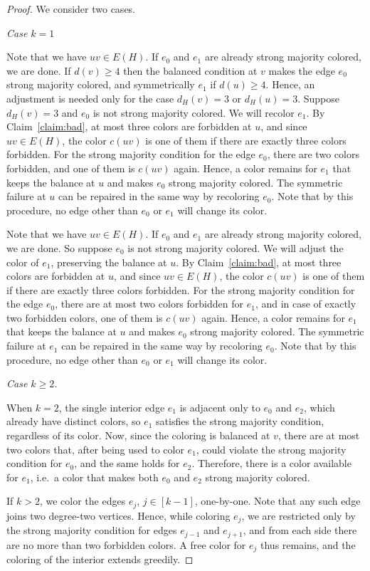 \documentclass[10pt,a4paper]{amsart}
\begin{document}
\begin{proof}
We consider two cases.

\smallskip
\emph{Case $k=1$}
\smallskip

Note that we have $uv\in E(H)$. If $e_0$ and $e_1$ are already strong majority colored, we are done. If $d(v)\ge 4$ then the balanced condition at $v$ makes the edge $e_0$ strong majority colored, and symmetrically $e_1$ if $d(u)\ge 4$. Hence, an adjustment is needed only for the case $d_H(v)=3$ or $d_H(u)=3$. Suppose $d_H(v)=3$ and $e_0$ is not strong majority colored. We will recolor $e_1$. By Claim~\ref{claim:bad}, at most three colors are forbidden at $u$, and since $uv\in E(H)$, the color $c(uv)$ is one of them if there are exactly three colors forbidden. For the strong majority condition for the edge $e_0$, there are two colors forbidden, and one of them is $c(uv)$ again. Hence, a color remains for $e_1$ that keeps the balance at $u$ and makes $e_0$ strong majority colored. The symmetric failure at $u$ can be repaired in the same way by recoloring $e_0$. Note that by this procedure, no edge other than $e_0$ or $e_1$ will change its color.

Note that we have $uv\in E(H)$. If $e_0$ and $e_1$ are already strong majority colored, we are done. So suppose $e_0$ is not strong majority colored. We will adjust the color of $e_1$, preserving the balance at $u$. By Claim~\ref{claim:bad}, at most three colors are forbidden at $u$, and since $uv\in E(H)$, the color $c(uv)$ is one of them if there are exactly three colors forbidden. For the strong majority condition for the edge $e_0$, there are at most two colors forbidden for $e_1$, and in case of exactly two forbidden colors, one of them is $c(uv)$ again. Hence, a color remains for $e_1$ that keeps the balance at $u$ and makes $e_0$ strong majority colored. The symmetric failure at $e_1$ can be repaired in the same way by recoloring $e_0$. Note that by this procedure, no edge other than $e_0$ or $e_1$ will change its color.

\smallskip
\emph{Case $k\ge 2$.}
\smallskip

When $k=2$, the single interior edge $e_1$ is adjacent only to $e_0$ and $e_2$, which already have distinct colors, so $e_1$ satisfies the strong majority condition, regardless of its color. Now, since the coloring is balanced at $v$, there are at most two colors that, after being used to color $e_1$, could violate the strong majority condition for $e_0$, and the same holds for $e_2$. Therefore, there is a color available for $e_1$, i.e.~a color that makes both $e_0$ and $e_2$ strong majority colored. 

If $k>2$, we color the edges $e_j$, $j\in[k-1]$, one-by-one. Note that any such edge joins two degree-two vertices. Hence, while coloring $e_j$, we are restricted only by the strong majority condition for edges $e_{j-1}$ and $e_{j+1}$, and from each side there are no more than two forbidden colors. A free color for $e_j$ thus remains, and the coloring of the interior extends greedily. 
\end{proof}
\end{document}
